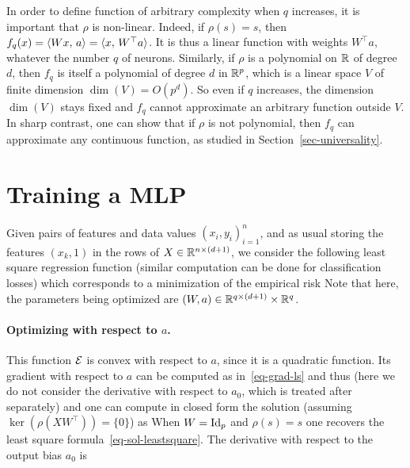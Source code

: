 In order to define function of arbitrary complexity when $q$ increases, it is important that $\rho$ is non-linear. Indeed, if $\rho(s)=s$, then $f_{q}(x) = \langle W x,\,a\rangle = \langle x,\,W^\top a\rangle$. It is thus a linear function with weights $W^\top a$, whatever the number $q$ of neurons.  
%
Similarly, if $\rho$ is a polynomial on $\mathbb{R}$ of degree $d$, then $f_q$ is itself a polynomial of degree $d$ in $\mathbb{R}^p$, which is a linear space $V$ of finite dimension $\dim(V) = O(p^d)$. So even if $q$ increases, the dimension $\dim(V)$ stays fixed and  $f_q$ cannot approximate an arbitrary function outside $V$. 
%
In sharp contrast, one can show that if $\rho$ is not polynomial, then $f_q$ can approximate any continuous function, as studied in Section~\ref{sec-universality}. 

\section{Training a MLP}

Given pairs of features and data values $(x_i,y_i)_{i=1}^n$, and as usual storing the features $(x_k,1)$ in the rows of $X \in \mathbb{R}^{n \times (d+1)}$, we consider the following least square regression function (similar computation can be done for classification losses) which corresponds to a minimization of the empirical risk
Note that here, the parameters being optimized are $(W,a) \in \mathbb{R}^{q \times (d+1)} \times \mathbb{R}^q$.

\paragraph{Optimizing with respect to $a$.}

% 
This function $\mathcal{E}$ is convex with respect to $a$, since it is a quadratic function. Its gradient with respect to $a$ can be computed as in~\eqref{eq-grad-ls} and thus (here we do not consider the derivative with respect to $a_0$, which is treated after separately)
and one can compute in closed form the solution (assuming $\ker(\rho(XW^\top))=\{0\}$) as 
When $W=\mathrm{Id}_p$ and $\rho(s)=s$ one recovers the least square formula~\eqref{eq-sol-leastsquare}.
%
The derivative with respect to the output bias $a_0$ is 

